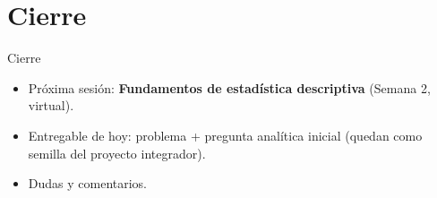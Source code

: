 \documentclass[aspectratio=169,11pt]{beamer}
\begin{document}
\section{Cierre}
\begin{frame}{Cierre}
  \begin{itemize}
    \item Próxima sesión: \textbf{Fundamentos de estadística descriptiva} (Semana 2, virtual).
    \item Entregable de hoy: problema + pregunta analítica inicial (quedan como semilla del proyecto integrador).
    \item Dudas y comentarios.
  \end{itemize}
\end{frame}

{
\begin{frame}[plain]
\end{frame}
}
\end{document}
